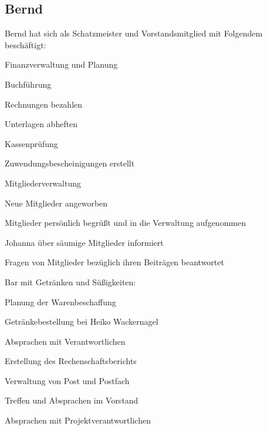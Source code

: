 \documentclass[ngerman]{scrartcl}
\begin{document}
\subsection{Bernd}
Bernd hat sich als Schatzmeister und Vorstandsmitglied mit Folgendem beschäftigt:
\begin{compactitem}
	\item Finanzverwaltung und Planung
	\begin{compactitem}
		\item Buchführung
		\item Rechnungen bezahlen
		\item Unterlagen abheften
		\item Kassenprüfung
		\item Zuwendungsbescheinigungen erstellt
	\end{compactitem}
	\item Mitgliederverwaltung
	\begin{compactitem}
		\item Neue Mitglieder angeworben
		\item Mitglieder persönlich begrüßt und in die Verwaltung aufgenommen
		\item Johanna über säumige Mitglieder informiert
		\item Fragen von Mitglieder bezüglich ihren Beiträgen beantwortet
	\end{compactitem}
	\item Bar mit Getränken und Süßigkeiten:
	\begin{compactitem}
		\item Planung der Warenbeschaffung
		\item Getränkebestellung bei Heiko Wackernagel
		\item Absprachen mit Verantwortlichen
	\end{compactitem}
	\item Erstellung des Rechenschaftsberichts
	\item Verwaltung von Post und Postfach
	\item Treffen und Absprachen im Vorstand
	\item Absprachen mit Projektverantwortlichen
\end{compactitem}
\end{document}
